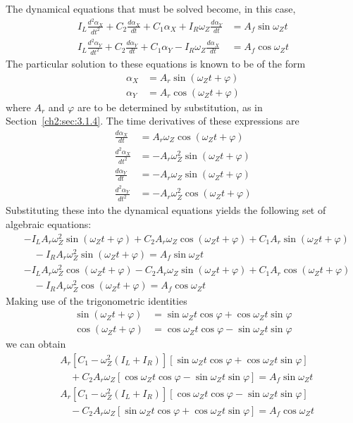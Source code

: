 The dynamical equations that must be solved become, in this case,
\begin{align*}
I_L\frac{d^{2}\alpha_X}{dt^{2}} + C_2\frac{d\alpha_X}{dt} + C_1\alpha_X
  + I_R\omega_Z\frac{d\alpha_Y}{dt} &= A_f\sin\omega_Z t\\
I_L\frac{d^{2}\alpha_Y}{dt^{2}} + C_2\frac{d\alpha_Y}{dt} + C_1\alpha_Y
  - I_R\omega_Z\frac{d\alpha_X}{dt} &= A_f\cos\omega_Z t
\end{align*}
The particular solution to these equations is known to be of the form
\begin{align*}
\alpha_X &= A_r\sin(\omega_Z t + \varphi)\\
\alpha_Y &= A_r\cos(\omega_Z t + \varphi)
\end{align*}
where $A_r$ and $\varphi$ are to be determined by substitution, as in
Section~\ref{ch2:sec:3.1.4}. The time derivatives of these expressions are
\begin{align*}
\frac{d\alpha_X}{dt} &= A_r\omega_Z\cos(\omega_Z t + \varphi)\\
\frac{d^{2}\alpha_X}{dt^{2}} &= -A_r\omega_Z^{2}\sin(\omega_Z t + \varphi)\\
\frac{d\alpha_Y}{dt} &= -A_r\omega_Z\sin(\omega_Z t + \varphi)\\
\frac{d^{2}\alpha_Y}{dt^{2}} &= -A_r\omega_Z^{2}\cos(\omega_Z t + \varphi)
\end{align*}
Substituting these into the dynamical equations yields the following set of
algebraic equations:
\begin{align*}
&{-}I_L A_r\omega_Z^{2}\sin(\omega_Z t + \varphi)
  + C_2 A_r\omega_Z\cos(\omega_Z t + \varphi)
  + C_1 A_r\sin(\omega_Z t + \varphi)\\
&\quad - I_R A_r\omega_Z^{2}\sin(\omega_Z t + \varphi) = A_f\sin\omega_Z t\\[1ex]
&{-}I_L A_r\omega_Z^{2}\cos(\omega_Z t + \varphi)
  - C_2 A_r\omega_Z\sin(\omega_Z t + \varphi)
  + C_1 A_r\cos(\omega_Z t + \varphi)\\
&\quad - I_R A_r\omega_Z^{2}\cos(\omega_Z t + \varphi) = A_f\cos\omega_Z t
\end{align*}
Making use of the trigonometric identities
\begin{align*}
\sin(\omega_Z t + \varphi) &= \sin\omega_Z t\cos\varphi + \cos\omega_Z t\sin\varphi\\
\cos(\omega_Z t + \varphi) &= \cos\omega_Z t\cos\varphi - \sin\omega_Z t\sin\varphi
\end{align*}
we can obtain
\begin{align*}
&A_r\left[C_1 - \omega_Z^{2}(I_L + I_R)\right]
  \left[\sin\omega_Z t\cos\varphi + \cos\omega_Z t\sin\varphi\right]\\
&\quad + C_2 A_r\omega_Z\left[\cos\omega_Z t\cos\varphi - \sin\omega_Z t\sin\varphi\right]
  = A_f\sin\omega_Z t\\[1ex]
&A_r\left[C_1 - \omega_Z^{2}(I_L + I_R)\right]
  \left[\cos\omega_Z t\cos\varphi - \sin\omega_Z t\sin\varphi\right]\\
&\quad - C_2 A_r\omega_Z\left[\sin\omega_Z t\cos\varphi + \cos\omega_Z t\sin\varphi\right]
  = A_f\cos\omega_Z t
\end{align*}
